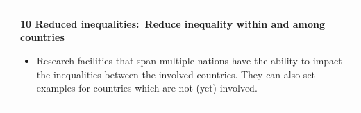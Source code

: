 \documentclass[../SustainableHEP.tex]{subfiles}
\begin{document}
\begin{longtable*}{l l}
\parbox[t]{\SDGleft\textwidth}{} & \parbox[t]{\SDGright\textwidth}{\textbf{10 Reduced inequalities:\ Reduce inequality within and among countries}
\begin{itemize}[leftmargin=20pt]
\item Research facilities that span multiple nations have the ability to impact the inequalities between the involved countries. They can also set examples for countries which are not (yet) involved.
\end{itemize}}\\


\end{longtable*}
\end{document}
